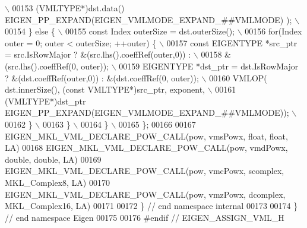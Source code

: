 \begin{DoxyCode}
{                         \(\backslash\)}
00153 \textcolor{preprocessor}{              (VMLTYPE*)dst.data() EIGEN\_PP\_EXPAND(EIGEN\_VMLMODE\_EXPAND\_##VMLMODE) );                      
                         \(\backslash\)}
00154 \textcolor{preprocessor}{      \} else \{                                                                                             
                         \(\backslash\)}
00155 \textcolor{preprocessor}{        const Index outerSize = dst.outerSize();                                                           
                         \(\backslash\)}
00156 \textcolor{preprocessor}{        for(Index outer = 0; outer < outerSize; ++outer) \{                                                 
                         \(\backslash\)}
00157 \textcolor{preprocessor}{          const EIGENTYPE *src\_ptr = src.IsRowMajor ? &(src.lhs().coeffRef(outer,0)) :                     
                         \(\backslash\)}
00158 \textcolor{preprocessor}{                                                      &(src.lhs().coeffRef(0, outer));                     
                         \(\backslash\)}
00159 \textcolor{preprocessor}{          EIGENTYPE *dst\_ptr = dst.IsRowMajor ? &(dst.coeffRef(outer,0)) : &(dst.coeffRef(0, outer));      
                         \(\backslash\)}
00160 \textcolor{preprocessor}{          VMLOP( dst.innerSize(), (const VMLTYPE*)src\_ptr, exponent,                                       
                         \(\backslash\)}
00161 \textcolor{preprocessor}{                 (VMLTYPE*)dst\_ptr EIGEN\_PP\_EXPAND(EIGEN\_VMLMODE\_EXPAND\_##VMLMODE));                       
                         \(\backslash\)}
00162 \textcolor{preprocessor}{        \}                                                                                                  
                         \(\backslash\)}
00163 \textcolor{preprocessor}{      \}                                                                                                    
                         \(\backslash\)}
00164 \textcolor{preprocessor}{    \}                                                                                                      
                         \(\backslash\)}
00165 \textcolor{preprocessor}{  \};}
00166   
00167 EIGEN\_MKL\_VML\_DECLARE\_POW\_CALL(pow, vmsPowx, \textcolor{keywordtype}{float},    \textcolor{keywordtype}{float},         LA)
00168 EIGEN\_MKL\_VML\_DECLARE\_POW\_CALL(pow, vmdPowx, \textcolor{keywordtype}{double},   \textcolor{keywordtype}{double},        LA)
00169 EIGEN\_MKL\_VML\_DECLARE\_POW\_CALL(pow, vmcPowx, scomplex, MKL\_Complex8,  LA)
00170 EIGEN\_MKL\_VML\_DECLARE\_POW\_CALL(pow, vmzPowx, dcomplex, MKL\_Complex16, LA)
00171 
00172 \} \textcolor{comment}{// end namespace internal}
00173 
00174 \} \textcolor{comment}{// end namespace Eigen}
00175 
00176 \textcolor{preprocessor}{#endif // EIGEN\_ASSIGN\_VML\_H}
\end{DoxyCode}
